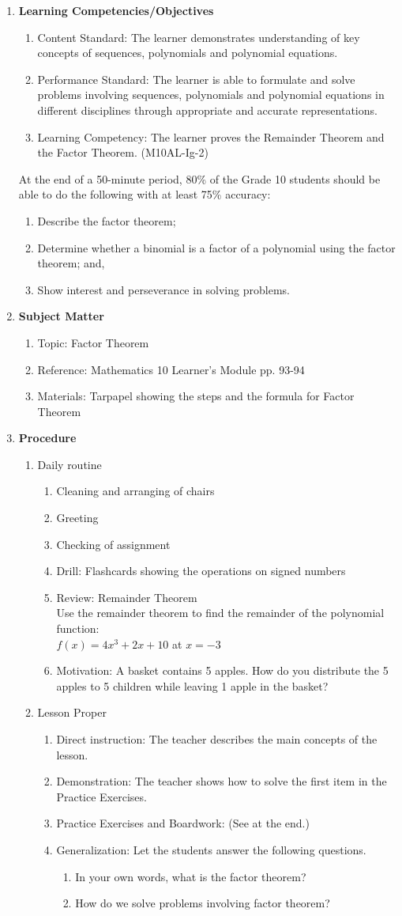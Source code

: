 \documentclass[12pt]{article}
\def \Grade {10
}
\def \ContentStandard {
The learner demonstrates understanding of key concepts of sequences, polynomials and polynomial equations.
}
\def \PerformanceStandard {
The learner is able to formulate and solve problems involving sequences, polynomials and polynomial equations in different 	 
disciplines through appropriate and accurate representations.
}
\def \LearningCompetency {
The learner proves the Remainder Theorem and the Factor Theorem. (M10AL-Ig-2)
}
\def \Objectives {
\item Describe the factor theorem; 
\item Determine whether a binomial is a factor of a polynomial using the factor theorem; and, 
\item Show interest and perseverance in solving problems. 
}
\def \Generalization {
\item[a. ] In your own words, what is the factor theorem?    
\item[b. ] How do we solve problems involving factor theorem? 
}
\def \Topic {
Factor Theorem 
}
\def \ReviewTopic {
Remainder Theorem \\
Use the remainder theorem  to find the remainder of the  polynomial function: \\
$f(x) = 4x^3+2x+10$ at $x = -3$  
}
\def \Motivation { A basket contains 5 apples. How do you distribute the 5 apples to 5 children while leaving 1 apple in the basket? 
}
\def \Reference {
Mathematics \Grade Learner’s Module pp. 93-94
}
\def \Materials {
Tarpapel showing the steps and the formula for\Topic
}
\def \DirectInstruction {

}
\begin{document}
\begin{enumerate}[label = \textbf{\Roman*. }]
\item \textbf{Learning Competencies/Objectives }

\begin{enumerate}[label = \Alph*. ]
\item Content Standard: \ContentStandard
\item Performance Standard: \PerformanceStandard
\item Learning Competency: \LearningCompetency
\end{enumerate}   

At the end of a 50-minute period, 80\% of the Grade \Grade students should be able to do the following with at least 75\% accuracy:
	\begin{enumerate}[label = \alph*. ]
	\Objectives 
	\end{enumerate}
	
\item \textbf{Subject Matter}
	\begin{enumerate}[label = \Alph*. ]
	\item Topic: \Topic
	\item Reference: \Reference
	\item Materials: \Materials
	\end{enumerate}

\item	 \textbf{Procedure}
	\begin{enumerate}[label = \Alph*. ]
	\item Daily routine
		\begin{enumerate}[label = \arabic*. ]
		\item Cleaning and arranging of chairs
		\item Greeting 
		\item Checking of assignment 
		\item Drill: Flashcards showing the operations on signed numbers 
		\item Review: \ReviewTopic
		\item Motivation: \Motivation
		\end{enumerate}
		
	\item Lesson Proper 
		\begin{enumerate}[label = \arabic*. ]
		\item Direct instruction: The teacher describes the main concepts of the lesson. \DirectInstruction
		\item Demonstration: The teacher shows how to solve the first item in the Practice Exercises. 
		\item Practice Exercises and Boardwork: (See at the end.) 	
		\item Generalization: 	Let the students answer the following questions. 
\begin{enumerate}[label = \arabic*. ]
\Generalization
\end{enumerate}


\end{enumerate}
\end{enumerate}
\end{enumerate}
\end{document}
